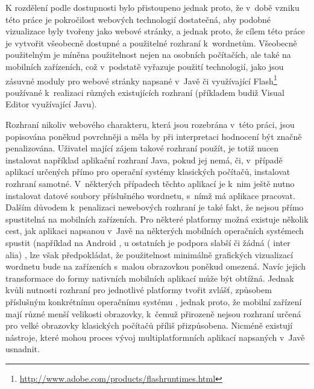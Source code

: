 \documentclass[a4paper, 11pt, oneside, showtrims]{book}
\begin{document}
				K rozdělení podle dostupnosti bylo přistoupeno jednak proto, že v~době vzniku této práce je pokročilost webových technologií dostatečná, aby podobné vizualizace byly tvořeny jako webové stránky, a jednak proto, že cílem této práce je vytvořit všeobecně dostupné a použitelné rozhraní k~wordnetům. Všeobecně použitelným je míněna použitelnost nejen na osobních počítačích, ale také na mobilních zařízeních, což v~podstatě vyřazuje použití technologií, jako jsou zásuvné moduly pro webové stránky napsané v~Javě či využívající Flash\footnote{\url{http://www.adobe.com/products/flashruntimes.html}} používané k~realizaci různých existujících rozhraní (příkladem budiž Visual Editor využívající Javu). 

				Rozhraní nikoliv webového charakteru, která jsou rozebrána v~této práci, jsou popisována poněkud povrchněji a měla by při interpretaci hodnocení být značně penalizována. Uživatel mající zájem takové rozhraní použít, je totiž nucen instalovat například aplikační rozhraní Java, pokud jej nemá, či, v~případě aplikací určených přímo pro operační systémy klasických počítačů, instalovat rozhraní samotné. V~některých případech těchto aplikací je k~nim ještě nutno instalovat datové soubory příslušného wordnetu, s~nímž má aplikace pracovat. Dalším důvodem k~penalizaci newebových rozhraní je také fakt, že nejsou přímo spustitelná na mobilních zařízeních. Pro některé platformy možná existuje několik cest, jak aplikaci napsanou v~Javě na některých mobilních operačních systémech spustit (například na Android \parencite{SX92854}, u ostatních je podpora slabší či žádná (\parencite{SX15501535,SX1193541} inter alia)%
				, lze však předpokládat, že použitelnost minimálně grafických vizualizací wordnetu bude na zařízeních s~malou obrazovkou poněkud omezená.  Navíc jejich transformace do formy nativních mobilních aplikací může být obtížná. Jednak kvůli nutnosti rozhraní pro jednotlivé platformy tvořit zvlášť, způsobem příslušným konkrétnímu operačnímu systému \parencite{gronli2014mobile}, jednak proto, že mobilní zařízení mají různé menší velikosti obrazovky, k~čemuž přirozeně nejsou rozhraní určená pro velké obrazovky klasických počítačů příliš přizpůsobena. Nicméně existují nástroje, které mohou proces vývoj multiplatformních aplikací napsaných v~Javě usnadnit. \parencite{mafintro}
\end{document}
